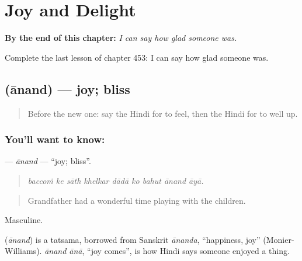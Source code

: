 
\chapter{Joy and Delight}
\label{ch:hi-joy-and-delight}

\begin{chapteropening}
\textbf{By the end of this chapter:} \emph{I can say how glad someone was.}

Complete the last lesson of chapter 453: I can say how glad someone was.
\end{chapteropening}

\section[\texorpdfstring{\hi{आनंद} (ānand)}{आनंद (ānand)}]{ (ānand) — joy; bliss}

\label{lesson:HI-C453-anand}



\begin{quote}
Before the new one: say the Hindi for to feel, then the Hindi for to well up.
\end{quote}

\subsection*{You'll want to know: }
\textbf{} — \emph{ānand} — \textquotedblleft{}joy; bliss\textquotedblright{}.

\begin{quote}
        
\end{quote}

\begin{quote}
\emph{baccoṁ ke sāth khelkar dādā ko bahut ānand āyā.}
\end{quote}

\begin{quote}
Grandfather had a wonderful time playing with the children.
\end{quote}

Masculine.

\begin{cousinweb}
\textbf{} (\emph{ānand}) is a tatsama, borrowed from Sanskrit \emph{ānanda}, \textquotedblleft{}happiness, joy\textquotedblright{} (Monier-Williams). \emph{ānand ānā}, \textquotedblleft{}joy comes\textquotedblright{}, is how Hindi says someone enjoyed a thing.
\end{cousinweb}


